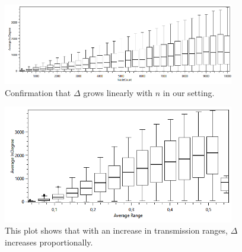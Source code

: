 \begin{figure}[ht]
	\centering
		\includegraphics[width=0.90\textwidth]{figures/plots/boxplotndelta.png}
	\caption{Confirmation that $\Delta$ grows linearly with $n$ in our setting.}
	\label{fig:boxplotndelta}
\end{figure}

\begin{figure}[ht]
	\centering
		\includegraphics[width=0.90\textwidth]{figures/plots/boxplotaveragerangedelta.png}
	\caption{This plot shows that with an increase in transmission ranges, $\Delta$ increases proportionally.}
	\label{fig:boxplotaveragerangedelta}
\end{figure}



